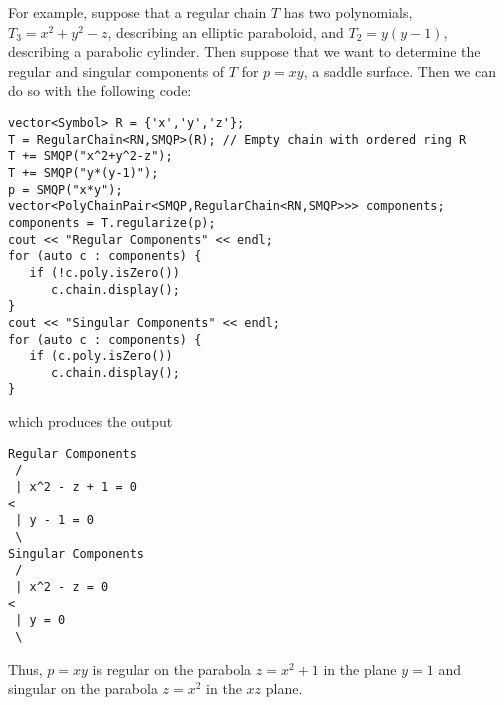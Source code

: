 For example, suppose that a regular chain $T$ has two polynomials, $T_3=x^2+y^2-z$, describing an elliptic paraboloid, and $T_2=y(y-1)$, describing a parabolic cylinder. Then suppose that we want to determine the regular and singular components of $T$ for $p=xy$, a saddle surface. Then we can do so with the following code:
\begin{verbatim}vector<Symbol> R = {'x','y','z'};
T = RegularChain<RN,SMQP>(R); // Empty chain with ordered ring R
T += SMQP("x^2+y^2-z");
T += SMQP("y*(y-1)");
p = SMQP("x*y");
vector<PolyChainPair<SMQP,RegularChain<RN,SMQP>>> components;
components = T.regularize(p);
cout << "Regular Components" << endl;
for (auto c : components) {
   if (!c.poly.isZero())
      c.chain.display();
}
cout << "Singular Components" << endl;
for (auto c : components) {
   if (c.poly.isZero())
      c.chain.display();
}
\end{verbatim}
which produces the output
\begin{verbatim}
Regular Components
 /
 | x^2 - z + 1 = 0
< 
 | y - 1 = 0
 \ 
Singular Components
 /
 | x^2 - z = 0
< 
 | y = 0
 \ 
\end{verbatim}
Thus, $p=xy$ is regular on the parabola $z=x^2+1$ in the plane $y=1$ and singular on the parabola $z=x^2$ in the $xz$ plane.
